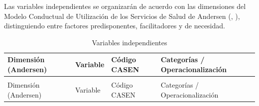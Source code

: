 \documentclass[
  spanish,
  a4paper,
  oneside]{scrbook}
\begin{document}
Las variables independientes se organizarán de acuerdo con las
dimensiones del Modelo Conductual de Utilización de los Servicios de
Salud de Andersen (,
), distinguiendo entre
factores predisponentes, facilitadores y de necesidad.

\begin{longtable}[t]{>{\raggedright\arraybackslash}p{3cm}>{\raggedright\arraybackslash}p{3.5cm}>{\raggedright\arraybackslash}p{2cm}>{\raggedright\arraybackslash}p{6.5cm}}

\caption{\label{tbl-operacionalizacion}Variables independientes}

\tabularnewline

\toprule
Dimensión (Andersen) & Variable & Código CASEN & Categorías / Operacionalización\\
\midrule
\endfirsthead
\multicolumn{4}{@{}l}{\textit{(continued)}}\\
\toprule
Dimensión (Andersen) & Variable & Código CASEN & Categorías / Operacionalización\\
\midrule
\endhead


\end{longtable}
\end{document}
